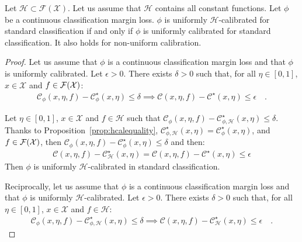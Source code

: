 \begin{prop*}
Let $\mathcal{H}\subset \mathcal{F}(\mathcal{X})$. Let us assume that $\mathcal{H}$ contains all constant functions. Let $\phi$ be a continuous classification margin loss.  $\phi$ is uniformly $\mathcal{H}$-calibrated for standard classification if and only if  $\phi$ is uniformly calibrated for standard classification. It also holds for non-uniform calibration.
\end{prop*}
\begin{proof}
Let us assume that $\phi$ is a continuous classification margin loss and that $\phi$ is uniformly calibrated. Let $\epsilon>0$. There exists $\delta>0$ such that, for all $\eta\in[0,1]$, $x\in\mathcal{X}$ and $f\in\mathcal{F}(\mathcal{X})$:
\begin{align*}
    \mathcal{C}_{\phi}(x,\eta,f)- \mathcal{C}^\star_{\phi}(x,\eta)\leq\delta\implies\mathcal{C}(x,\eta,f)- \mathcal{C}^\star(x,\eta)\leq \epsilon\quad.
\end{align*}

Let $\eta\in[0,1]$, $x\in\mathcal{X}$ and $f\in\mathcal{H}$ such that $ \mathcal{C}_{\phi}(x,\eta,f)- \mathcal{C}^\star_{\phi,\mathcal{H}}(x,\eta)\leq\delta$. Thanks to Proposition~\ref{prop:hcalequality}, $\mathcal{C}^\star_{\phi,\mathcal{H}}(x,\eta)=\mathcal{C}^\star_{\phi}(x,\eta)$, and $f\in\mathcal{F}(\mathcal{X})$, then $\mathcal{C}_{\phi}(x,\eta,f)- \mathcal{C}^\star_{\phi}(x,\eta)\leq\delta$ and  then:
\begin{align*}
    \mathcal{C}(x,\eta,f)- \mathcal{C}^\star_{\mathcal{H}}(x,\eta) =  \mathcal{C}(x,\eta,f)- \mathcal{C}^\star(x,\eta) \leq\epsilon
\end{align*}
Then $\phi$ is uniformly $\mathcal{H}$-calibrated in standard classification.

Reciprocally, let us assume that $\phi$ is a continuous classification margin loss and that $\phi$ is uniformly $\mathcal{H}$-calibrated. Let $\epsilon>0$. There exists $\delta>0$ such that, for all $\eta\in[0,1]$, $x\in\mathcal{X}$ and $f\in\mathcal{H}$:
\begin{align*}
    \mathcal{C}_{\phi}(x,\eta,f)- \mathcal{C}^\star_{\phi,\mathcal{H}}(x,\eta)\leq\delta\implies\mathcal{C}(x,\eta,f)- \mathcal{C}^\star_\mathcal{H}(x,\eta)\leq \epsilon\quad.
\end{align*}



\end{proof}
